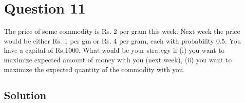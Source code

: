 \section*{Question 11}

The price of some commodity is Rs. 2 per gram this week.
Next week the price would be either Rs. 1 per gm or Rs. 4 per gram, each with probability 0.5.
You have a capital of Rs.1000.
What would be your strategy if
(i) you want to maximize expected amount of money with you (next week),
(ii) you want to maximize the expected quantity of the commodity with you.

\subsection*{Solution}
